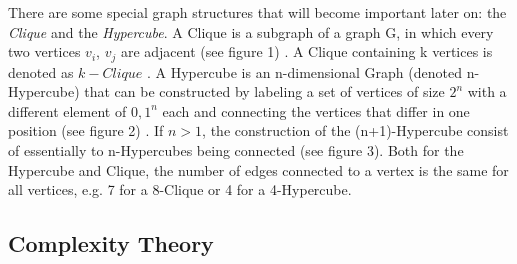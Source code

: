 \documentclass[12pt,a4paper]{article}
\begin{document}
\par There are some special graph structures that will become important later on: the \textit{Clique} and the \textit{Hypercube}. A Clique is a subgraph of a graph G, in which every two vertices $v_i$, $v_j$ are adjacent (see figure 1) \citep{Gross2013}. A Clique containing k vertices is denoted as $k-Clique$ \citep{Bollobas1998}. 
\newline
\newline
A Hypercube is an n-dimensional Graph (denoted n-Hypercube) that can be constructed by labeling a set of vertices of size $2^n$ with a different element of ${0, 1}^n$ each and connecting the vertices that differ in one position (see figure 2) \citep{Bollobas1998}. If $n > 1$, the construction of the (n+1)-Hypercube consist of essentially to n-Hypercubes being connected (see figure 3). Both for the Hypercube and Clique, the number of edges connected to a vertex is the same for all vertices, e.g. 7 for a 8-Clique or 4 for a 4-Hypercube.
\newline

\par
\begin{figure}[h]
\begin{minipage}{.3\textwidth}
	
\end{minipage}
\begin{minipage}{.5\textwidth}
	
	\centering
	 	
\end{minipage}
\end{figure}

\newpage
\subsection{Complexity Theory}
\end{document}

